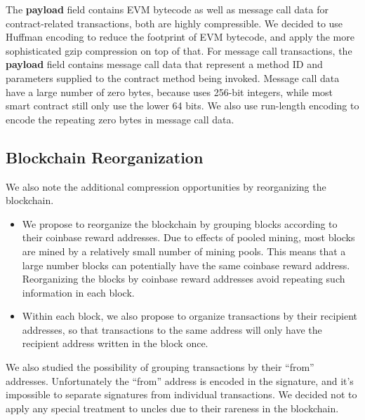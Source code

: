 The \textbf{payload} field contains EVM bytecode as well as message call data for contract-related transactions,
both are highly compressible. We decided to use Huffman encoding to reduce the footprint of EVM bytecode,
and apply the more sophisticated gzip compression on top of that.
For message call transactions, the \textbf{payload} field contains message call data that represent a method ID and
parameters supplied to the contract method being invoked.
Message call data have a large number of zero bytes, because \eth{} uses 256-bit integers,
while most smart contract still only use the lower 64 bits.
We also use run-length encoding to encode the repeating zero bytes in message call data.

\subsection{Blockchain Reorganization}

We also note the additional compression opportunities by reorganizing the blockchain.
\begin{itemize}
	\item We propose to reorganize the blockchain by grouping blocks according to their coinbase reward addresses.
Due to effects of pooled mining, most blocks are mined by a relatively small number of mining pools.
This means that a large number blocks can potentially have the same coinbase reward address.
Reorganizing the blocks by coinbase reward addresses avoid repeating such information in each block.
\item Within each block, we also propose to organize transactions by their recipient addresses, so that
transactions to the same address will only have the recipient address written in the block once.
\end{itemize}

We also studied the possibility of grouping transactions by their ``from'' addresses.
Unfortunately the ``from'' address is encoded in the signature, and it's impossible to
separate signatures from individual transactions.
We decided not to apply any special treatment to uncles due to their rareness in the blockchain.



